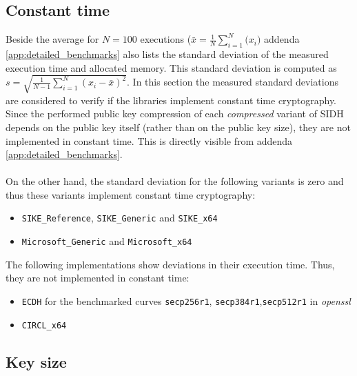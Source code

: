 \subsection{Constant time}\label{sec:analysis_security_time}
Beside the average for $N=100$ executions ($\bar{x}=\frac{1}{N}\sum_{i=1}^N{(x_i})$ addenda \ref{app:detailed_benchmarks} also lists the standard deviation of the measured execution time and allocated memory. This standard deviation is computed as $s=\sqrt{\frac{1}{N-1}\sum_{i=1}^N(x_i-\bar{x})^2}$. In this section the measured standard deviations are considered to verify if the libraries implement constant time cryptography.\\
Since the performed public key compression of each \textit{compressed} variant of SIDH depends on the public key itself (rather than on the public key size), they are not implemented in constant time. This is directly visible from  addenda \ref{app:detailed_benchmarks}.\\\\
On the other hand, the standard deviation for the following variants is zero and thus these variants implement constant time cryptography:
\begin{itemize}
\item \texttt{SIKE\_Reference}, \texttt{SIKE\_Generic} and \texttt{SIKE\_x64}
\item \texttt{Microsoft\_Generic} and \texttt{Microsoft\_x64}
\end{itemize}
The following implementations show deviations in their execution time. Thus, they are not implemented in constant time:

\begin{itemize}
\item \texttt{ECDH} for the benchmarked curves \texttt{secp256r1},  \texttt{secp384r1},\texttt{secp512r1} in \textit{openssl}
\item \texttt{CIRCL\_x64}
\end{itemize}

\subsection{Key size}\label{sec:analysis_security_keys}

